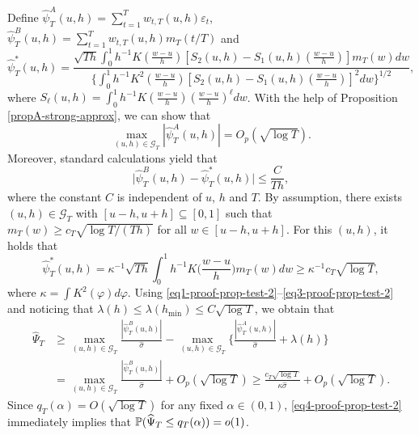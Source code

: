 Define $\widehat{\psi}_T^A(u,h) = \sum\nolimits_{t=1}^T w_{t,T}(u,h) \varepsilon_t$, $\widehat{\psi}_T^B(u,h) = \sum\nolimits_{t=1}^T w_{t,T}(u,h) m_T(t/T)$ and
\[ \widehat{\psi}_T^*(u,h) = \frac{ \sqrt{Th} \int_0^1 h^{-1} K(\frac{w-u}{h}) [S_2(u,h) - S_1(u,h)(\frac{w-u}{h})] m_T(w) dw }{ \{ \int_0^1 h^{-1} K^2(\frac{w-u}{h}) [S_2(u,h) - S_1(u,h)(\frac{w-u}{h})]^2 dw \}^{1/2} }, \] 
where $S_\ell(u,h) = \int_0^1 h^{-1} K(\frac{w-u}{h}) (\frac{w-u}{h})^\ell dw$. With the help of Proposition \ref{propA-strong-approx}, we can show that
\begin{equation}\label{eq1-proof-prop-test-2}
\max_{(u,h) \in \mathcal{G}_T} |\widehat{\psi}_T^A(u,h)| = O_p(\sqrt{\log T}). 
\end{equation}
Moreover, standard calculations yield that 
\begin{equation}\label{eq2-proof-prop-test-2}
\big| \widehat{\psi}_T^B(u,h) - \widehat{\psi}_T^*(u,h) \big| \le \frac{C}{Th}, 
\end{equation}
where the constant $C$ is independent of $u$, $h$ and $T$. By assumption, there exists $(u,h) \in \mathcal{G}_T$ with $[u-h,u+h] \subseteq [0,1]$ such that $m_T(w) \ge c_T \sqrt{\log T/(Th)}$ for all $w \in [u-h,u+h]$. For this $(u,h)$, it holds that 
\begin{equation}\label{eq3-proof-prop-test-2}
\widehat{\psi}_T^*(u,h) = \kappa^{-1} \sqrt{Th} \int_0^1 h^{-1} K\Big(\frac{w-u}{h}\Big) m_T(w) dw \ge \kappa^{-1} c_T \sqrt{\log T},  
\end{equation}
where $\kappa = \int K^2(\varphi)d\varphi$. Using \eqref{eq1-proof-prop-test-2}--\eqref{eq3-proof-prop-test-2} and noticing that $\lambda(h) \le \lambda(h_{\min}) \le C \sqrt{\log T}$, we obtain that 
\begin{align}
\widehat{\Psi}_T 
 & \ge \max_{(u,h) \in \mathcal{G}_T} \frac{|\widehat{\psi}_T^B(u,h)|}{\widehat{\sigma}} - \max_{(u,h) \in \mathcal{G}_T} \Big\{ \frac{|\widehat{\psi}_T^A(u,h)|}{\widehat{\sigma}} + \lambda(h) \Big\} \nonumber \\
 & = \max_{(u,h) \in \mathcal{G}_T} \frac{|\widehat{\psi}_T^B(u,h)|}{\widehat{\sigma}} + O_p(\sqrt{\log T}) \ge \frac{c_T \sqrt{\log T}}{\kappa \widehat{\sigma}} + O_p(\sqrt{\log T}). \label{eq4-proof-prop-test-2}
\end{align}  
Since $q_T(\alpha) = O(\sqrt{\log T})$ for any fixed $\alpha \in (0,1)$, \eqref{eq4-proof-prop-test-2} immediately implies that $\mathbb{P}(\widehat{\Psi}_T \le q_T(\alpha)) = o(1)$. 



